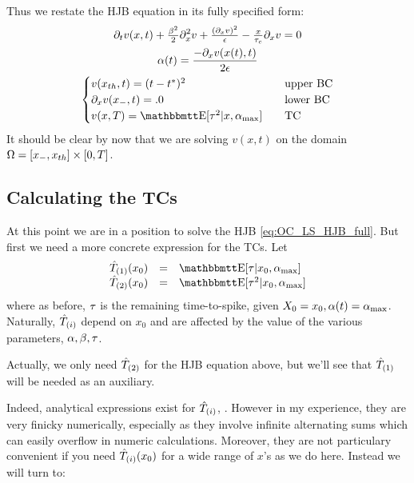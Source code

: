 \documentclass{article}
\begin{document}
Thus we restate the HJB equation in its fully specified form:
\begin{equation}
\begin{gathered}
\di_t v(x,t) + \tfrac{\b^2}{2} \di_x^2 v + \tfrac{(\di_x v)^2}{\e}
-\tfrac{x}{\tc}\di_x v = 0
\\
\a(t) =
\frac{-\di_x v(x(t),t)}{2\e}
\\
\begin{cases}
v(\xth,t) = (t-\T)^2  \quad & \textrm{upper BC}
\\
\di_x v(\xmin, t)  = .0  \quad &\textrm{lower BC}
\\
v(x,T)  = \Exp[\t^2|x, \amax]  \quad& \textrm{TC}
\end{cases}
\end{gathered}
\label{eq:OC_LS_HJB_full}
\end{equation} 
It should be clear by now that we are solving $v(x,t)$ on the domain ${\Omega} =
[{ x_{-} }, { x_{th} }] \times [0,T]$.

\subsection{Calculating the TCs}
\label{sec:calculating_TCs}
At this point we are in a position to solve the HJB \cref{eq:OC_LS_HJB_full}.
But first we need a more concrete expression for the TCs. Let
\begin{equation}
\begin{array}{lcl}
\Tone(x_0) &=& \Exp[\t|x_0, \amax] 
\\
\Ttwo(x_0) &=& \Exp[\t^2|x_0, \amax]  
\end{array}
\end{equation}
where as before, ${\tau}$ is the remaining time-to-spike, given $X_0 = x_0, {\alpha}(t) =
{ {\alpha}_{\textrm{max}} }$. Naturally, ${ \hat{T}_{(i)} }$ depend on $x_0$ and are affected by the value of the
various parameters, ${\alpha},{\beta},{\tau}$. 

Actually, we only  need ${ \hat{T}_{(2)} }$ for the HJB equation above, but we'll see that
${ \hat{T}_{(1)} }$ will be needed as an auxiliary.

Indeed, analytical expressions exist for ${ \hat{T}_{(i)} }$, \cite{Inoue1995}. However in my
experience, they are very finicky numerically, especially as they involve
infinite alternating sums which can easily overflow in numeric calculations.
Moreover, they are not particulary convenient if you need ${ \hat{T}_{(i)} } (x_0)$ for a wide
range of $x$'s as we do here. Instead we will turn to:
\end{document}
